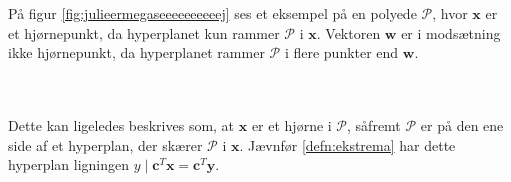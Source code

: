 \noindent
%
På figur \ref{fig:julieermegaseeeeeeeeeej} ses et eksempel på en polyede $\mathcal{P}$, hvor $\textbf{x}$ er et hjørnepunkt, da hyperplanet kun rammer $\mathcal{P}$ i $\mathbf{x}$. 
Vektoren $\textbf{w}$ er i modsætning ikke hjørnepunkt, da hyperplanet rammer $\mathcal{P}$ i flere punkter end $\mathbf{w}$.
%

\\\\
%
Dette kan ligeledes beskrives som, at $\mathbf{x}$ er et hjørne i $\mathcal{P}$, såfremt $\mathcal{P}$ er på den ene side af et hyperplan, der skærer $\mathcal{P}$ i $\mathbf{x}$. 
Jævnfør \ref{defn:ekstrema} har dette hyperplan ligningen $y \mid \mathbf{c}^T\mathbf{x}=\mathbf{c}^T\mathbf{y}.$